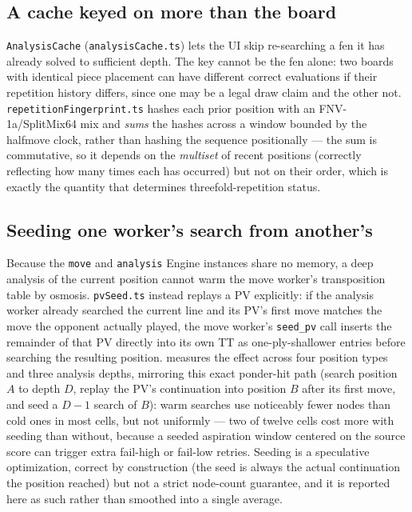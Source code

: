 \documentclass[10pt,twocolumn]{article}
\newcommand{\code}[1]{\texttt{#1}}
\begin{document}
\subsection{A cache keyed on more than the board}

\code{AnalysisCache} (\code{analysisCache.ts}) lets the UI skip re-searching
a fen it has already solved to sufficient depth. The key cannot be the fen
alone: two boards with identical piece placement can have different correct
evaluations if their repetition history differs, since one may be a legal
draw claim and the other not.  \code{repetitionFingerprint.ts} hashes each
prior position with an FNV-1a/SplitMix64 mix and \emph{sums} the hashes
across a window bounded by the halfmove clock, rather than hashing the
sequence positionally --- the sum is commutative, so it depends on the
\emph{multiset} of recent positions (correctly reflecting how many times
each has occurred) but not on their order, which is exactly the quantity
that determines threefold-repetition status.

\subsection{Seeding one worker's search from another's}

Because the \code{move} and \code{analysis} Engine instances share no
memory, a deep analysis of the current position cannot warm the move
worker's transposition table by osmosis. \code{pvSeed.ts} instead replays a
PV explicitly: if the analysis worker already searched the current line and
its PV's first move matches the move the opponent actually played, the move
worker's \code{seed\_pv} call inserts the remainder of that PV directly into
its own TT as one-ply-shallower entries before searching the resulting
position.  measures the effect across four position types
and three analysis depths, mirroring this exact ponder-hit path (search
position $A$ to depth $D$, replay the PV's continuation into position $B$
after its first move, and seed a $D{-}1$ search of $B$): warm searches use
noticeably fewer nodes than cold ones in most cells, but not uniformly ---
two of twelve cells cost more with seeding than without, because a seeded
aspiration window centered on the source score can trigger extra fail-high
or fail-low retries. Seeding is a speculative optimization, correct by
construction (the seed is always the actual continuation the position
reached) but not a strict node-count guarantee, and it is reported here as
such rather than smoothed into a single average.
\end{document}
